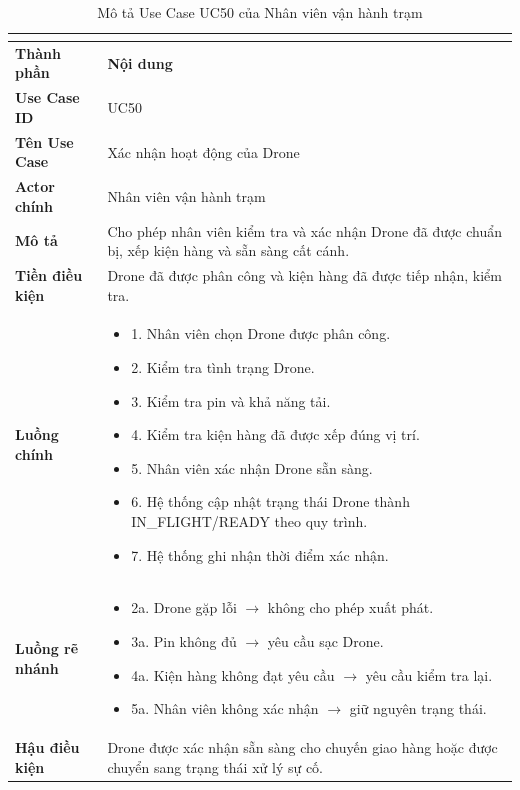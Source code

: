 \begin{longtable}{|C{3cm}|L{11cm}|}
\caption{Mô tả Use Case UC50 của Nhân viên vận hành trạm}\\
\label{tab:mo-ta-uc50-van-hanh-tram}\\
\hline
\textbf{Thành phần} & \textbf{Nội dung} \\
\hline
\textbf{Use Case ID} & UC50 \\
\hline
\textbf{Tên Use Case} & Xác nhận hoạt động của Drone \\
\hline
\textbf{Actor chính} & Nhân viên vận hành trạm \\
\hline
\textbf{Mô tả} &
Cho phép nhân viên kiểm tra và xác nhận Drone đã được chuẩn bị, xếp kiện hàng và sẵn sàng cất cánh.
\\
\hline
\textbf{Tiền điều kiện} &
Drone đã được phân công và kiện hàng đã được tiếp nhận, kiểm tra.
\\
\hline
\textbf{Luồng chính} &
\begin{itemize}[leftmargin=*,topsep=2pt,itemsep=2pt]
    \item 1. Nhân viên chọn Drone được phân công.
    \item 2. Kiểm tra tình trạng Drone.
    \item 3. Kiểm tra pin và khả năng tải.
    \item 4. Kiểm tra kiện hàng đã được xếp đúng vị trí.
    \item 5. Nhân viên xác nhận Drone sẵn sàng.
    \item 6. Hệ thống cập nhật trạng thái Drone thành IN\_FLIGHT/READY theo quy trình.
    \item 7. Hệ thống ghi nhận thời điểm xác nhận.
\end{itemize}
\\
\hline
\textbf{Luồng rẽ nhánh} &
\begin{itemize}[leftmargin=*,topsep=2pt,itemsep=2pt]
    \item 2a. Drone gặp lỗi $\rightarrow$ không cho phép xuất phát.
    \item 3a. Pin không đủ $\rightarrow$ yêu cầu sạc Drone.
    \item 4a. Kiện hàng không đạt yêu cầu $\rightarrow$ yêu cầu kiểm tra lại.
    \item 5a. Nhân viên không xác nhận $\rightarrow$ giữ nguyên trạng thái.
\end{itemize}
\\
\hline
\textbf{Hậu điều kiện} &
Drone được xác nhận sẵn sàng cho chuyến giao hàng hoặc được chuyển sang trạng thái xử lý sự cố.
\\
\hline
\end{longtable}


